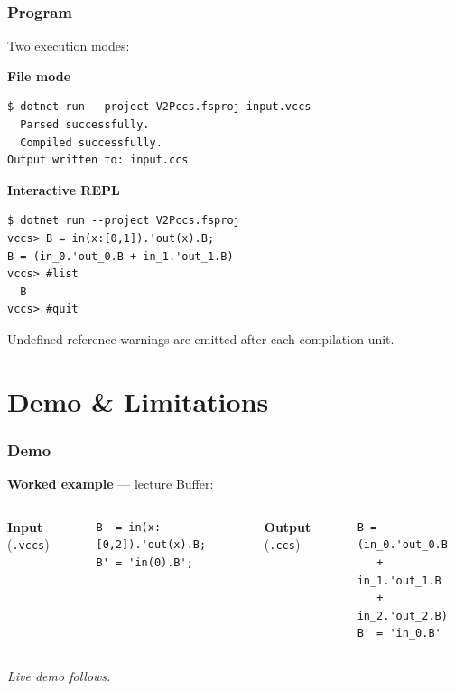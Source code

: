 \documentclass[t]{beamer}
\begin{document}
  \begin{frame}[fragile]
    \frametitle{Program}

    Two execution modes:

    \vspace{0.3cm}

    \textbf{File mode}
    \begin{lstlisting}[language={}, basicstyle=\ttfamily\scriptsize]
$ dotnet run --project V2Pccs.fsproj input.vccs
  Parsed successfully.
  Compiled successfully.
Output written to: input.ccs
    \end{lstlisting}

    \vspace{0.3cm}

    \textbf{Interactive REPL}
    \begin{lstlisting}[language={}, basicstyle=\ttfamily\scriptsize]
$ dotnet run --project V2Pccs.fsproj
vccs> B = in(x:[0,1]).'out(x).B;
B = (in_0.'out_0.B + in_1.'out_1.B)
vccs> #list
  B
vccs> #quit
    \end{lstlisting}

    \vspace{0.2cm}
    \small Undefined-reference warnings are emitted after each compilation unit.

  \end{frame}

\section{Demo \& Limitations}

  \begin{frame}[fragile]
    \frametitle{Demo}

    \textbf{Worked example} — lecture Buffer:

    \vspace{0.2cm}

    \begin{columns}[t]
      \textbf{Input} (\texttt{.vccs})
      \begin{lstlisting}[basicstyle=\ttfamily\scriptsize]
B  = in(x:[0,2]).'out(x).B;
B' = 'in(0).B';
      \end{lstlisting}

      \textbf{Output} (\texttt{.ccs})
      \begin{lstlisting}[basicstyle=\ttfamily\scriptsize]
B = (in_0.'out_0.B
   + in_1.'out_1.B
   + in_2.'out_2.B)
B' = 'in_0.B'
      \end{lstlisting}
    \end{columns}

    \vspace{0.4cm}
    \textit{Live demo follows.}

  \end{frame}
\end{document}
